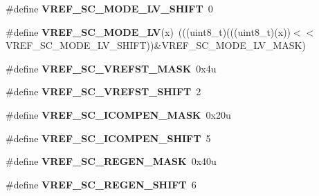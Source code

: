 \begin{DoxyCompactItemize}
\item 
\#define {\bfseries V\+R\+E\+F\+\_\+\+S\+C\+\_\+\+M\+O\+D\+E\+\_\+\+L\+V\+\_\+\+S\+H\+I\+FT}~0\hypertarget{group__VREF__Register__Masks_ga3130891ca865a042a784a2c3bc7141b0}{}\label{group__VREF__Register__Masks_ga3130891ca865a042a784a2c3bc7141b0}

\item 
\#define {\bfseries V\+R\+E\+F\+\_\+\+S\+C\+\_\+\+M\+O\+D\+E\+\_\+\+LV}(x)~(((uint8\+\_\+t)(((uint8\+\_\+t)(x))$<$$<$V\+R\+E\+F\+\_\+\+S\+C\+\_\+\+M\+O\+D\+E\+\_\+\+L\+V\+\_\+\+S\+H\+I\+FT))\&V\+R\+E\+F\+\_\+\+S\+C\+\_\+\+M\+O\+D\+E\+\_\+\+L\+V\+\_\+\+M\+A\+SK)\hypertarget{group__VREF__Register__Masks_ga2bd98e877f61a410c3226d6472365b5e}{}\label{group__VREF__Register__Masks_ga2bd98e877f61a410c3226d6472365b5e}

\item 
\#define {\bfseries V\+R\+E\+F\+\_\+\+S\+C\+\_\+\+V\+R\+E\+F\+S\+T\+\_\+\+M\+A\+SK}~0x4u\hypertarget{group__VREF__Register__Masks_gadc4f84c737775ee82f350149ade8f5bf}{}\label{group__VREF__Register__Masks_gadc4f84c737775ee82f350149ade8f5bf}

\item 
\#define {\bfseries V\+R\+E\+F\+\_\+\+S\+C\+\_\+\+V\+R\+E\+F\+S\+T\+\_\+\+S\+H\+I\+FT}~2\hypertarget{group__VREF__Register__Masks_ga88b36251362ceabbeeb2302dae65000d}{}\label{group__VREF__Register__Masks_ga88b36251362ceabbeeb2302dae65000d}

\item 
\#define {\bfseries V\+R\+E\+F\+\_\+\+S\+C\+\_\+\+I\+C\+O\+M\+P\+E\+N\+\_\+\+M\+A\+SK}~0x20u\hypertarget{group__VREF__Register__Masks_gaeb737c0b08409b6e7ea8de3bf7a90732}{}\label{group__VREF__Register__Masks_gaeb737c0b08409b6e7ea8de3bf7a90732}

\item 
\#define {\bfseries V\+R\+E\+F\+\_\+\+S\+C\+\_\+\+I\+C\+O\+M\+P\+E\+N\+\_\+\+S\+H\+I\+FT}~5\hypertarget{group__VREF__Register__Masks_gab4b6bb1062b8e67c9224814d85df2a2c}{}\label{group__VREF__Register__Masks_gab4b6bb1062b8e67c9224814d85df2a2c}

\item 
\#define {\bfseries V\+R\+E\+F\+\_\+\+S\+C\+\_\+\+R\+E\+G\+E\+N\+\_\+\+M\+A\+SK}~0x40u\hypertarget{group__VREF__Register__Masks_ga1396c56eb73d89394a57b1f83f20c9ea}{}\label{group__VREF__Register__Masks_ga1396c56eb73d89394a57b1f83f20c9ea}

\item 
\#define {\bfseries V\+R\+E\+F\+\_\+\+S\+C\+\_\+\+R\+E\+G\+E\+N\+\_\+\+S\+H\+I\+FT}~6\hypertarget{group__VREF__Register__Masks_gacfe64ba6f4a76a4aef274f2fedb95a90}{}\label{group__VREF__Register__Masks_gacfe64ba6f4a76a4aef274f2fedb95a90}


\end{DoxyCompactItemize}
